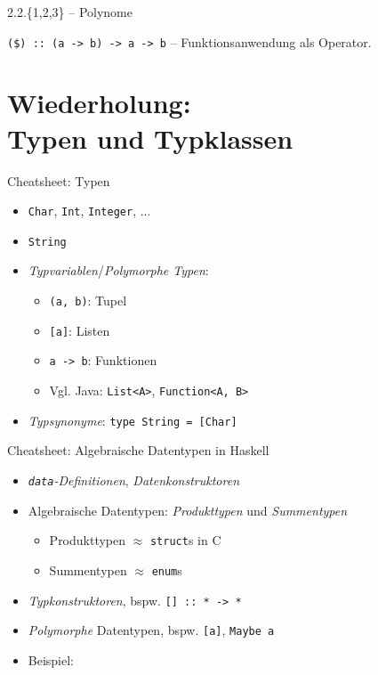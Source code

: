 \documentclass{beamer}
\begin{document}
\begin{frame}{2.2.\{1,2,3\} -- Polynome}

  \texttt{(\$) :: (a -> b) -> a -> b} -- Funktionsanwendung als Operator.
\end{frame}

\section{Wiederholung:\\Typen und Typklassen}

\begin{frame}{Cheatsheet: Typen}
  \begin{itemize}
    \item \texttt{Char}, \texttt{Int}, \texttt{Integer}, ...
    \item \texttt{String}
    \item \emph{Typvariablen}/\emph{Polymorphe Typen}:
    \begin{itemize}
      \item \texttt{(a, b)}: Tupel
      \item \texttt{[a]}: Listen
      \item \texttt{a -> b}: Funktionen
      \item Vgl. Java: \texttt{List<A>}, \texttt{Function<A, B>}
    \end{itemize}
    \item \emph{Typsynonyme}: \texttt{type String = [Char]}
  \end{itemize}
\end{frame}

\begin{frame}{Cheatsheet: Algebraische Datentypen in Haskell}
  \begin{itemize}
    \item \emph{\texttt{data}-Definitionen}, \emph{Datenkonstruktoren}
    \item Algebraische Datentypen: \emph{Produkttypen} und \emph{Summentypen}
    \begin{itemize}
      \item Produkttypen $\approx$ \texttt{struct}s in C
      \item Summentypen $\approx$ \texttt{enum}s
    \end{itemize}
    \item \emph{Typkonstruktoren}, bspw. \texttt{[] :: * -> *}
    \item \emph{Polymorphe} Datentypen, bspw. \texttt{[a]}, \texttt{Maybe a}
    \item Beispiel:
  \end{itemize}
\end{frame}
\end{document}
